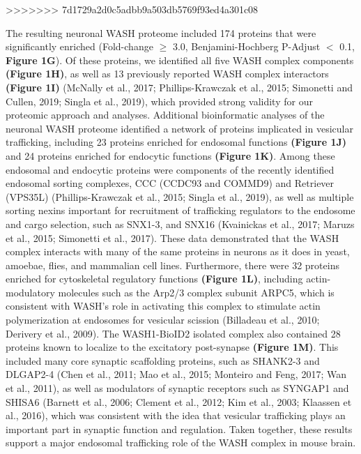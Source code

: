 >>>>>>> 7d1729a2d0c5adbb9a503db5769f93ed4a301c08

The resulting neuronal WASH proteome included 174 proteins that were
significantly enriched (Fold-change $\geq$ 3.0, Benjamini-Hochberg P-Adjust $<$ 0.1,
\textbf{Figure 1G}). Of these proteins, we identified all five WASH complex components
\textbf{(Figure 1H)}, as well as 13 previously reported WASH complex interactors 
\textbf{(Figure 1I)} (McNally et al., 2017; Phillips-Krawczak et al., 2015; Simonetti and
Cullen, 2019; Singla et al., 2019), which provided strong validity for our
proteomic approach and analyses. Additional bioinformatic analyses of the
neuronal WASH proteome identified a network of proteins implicated in vesicular
trafficking, including 23 proteins enriched for endosomal functions \textbf{(Figure 1J)}
and 24 proteins enriched for endocytic functions \textbf{(Figure 1K)}. Among these
endosomal and endocytic proteins were components of the recently identified
endosomal sorting complexes, CCC (CCDC93 and COMMD9) and Retriever (VPS35L)
(Phillips-Krawczak et al., 2015; Singla et al., 2019), as well as multiple
sorting nexins important for recruitment of trafficking regulators to the
endosome and cargo selection, such as SNX1-3, and SNX16 (Kvainickas et al.,
2017; Maruzs et al., 2015; Simonetti et al., 2017). These data demonstrated that
the WASH complex interacts with many of the same proteins in neurons as it does
in yeast, amoebae, flies, and mammalian cell lines. Furthermore, there were 32
proteins enriched for cytoskeletal regulatory functions \textbf{(Figure 1L)}, including
actin-modulatory molecules such as the Arp2/3 complex subunit ARPC5, which is
consistent with WASH’s role in activating this complex to stimulate actin
polymerization at endosomes for vesicular scission (Billadeau et al., 2010;
Derivery et al., 2009). The WASH1-BioID2 isolated complex also contained 28
proteins known to localize to the excitatory post-synapse \textbf{(Figure 1M)}. This
included many core synaptic scaffolding proteins, such as SHANK2-3 and DLGAP2-4
(Chen et al., 2011; Mao et al., 2015; Monteiro and Feng, 2017; Wan et al.,
2011), as well as modulators of synaptic receptors such as SYNGAP1 and SHISA6
(Barnett et al., 2006; Clement et al., 2012; Kim et al., 2003; Klaassen et al.,
2016), which was consistent with the idea that vesicular trafficking plays an
important part in synaptic function and regulation. Taken together, these
results support a major endosomal trafficking role of the WASH complex in mouse
brain. 


